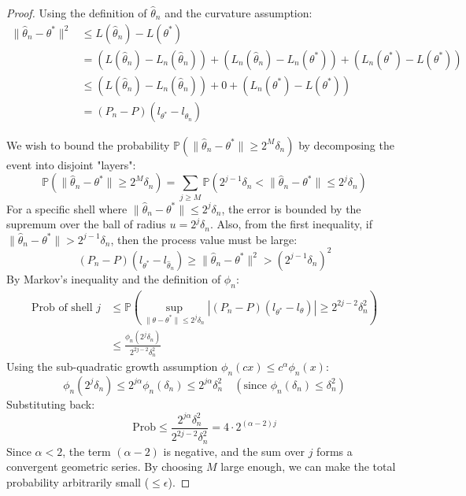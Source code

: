 \begin{proof}
Using the definition of $\hat{\theta}_n$ and the curvature assumption:
\begin{align*}
\|\hat{\theta}_n - \theta^*\|^2 &\le L(\hat{\theta}_n) - L(\theta^*) \\
&= (L(\hat{\theta}_n) - L_n(\hat{\theta}_n)) + (L_n(\hat{\theta}_n) - L_n(\theta^*)) + (L_n(\theta^*) - L(\theta^*)) \\
&\le (L(\hat{\theta}_n) - L_n(\hat{\theta}_n)) + 0 + (L_n(\theta^*) - L(\theta^*)) \\
&= (P_n - P)(l_{\theta^*} - l_{\hat{\theta}_n})
\end{align*}

We wish to bound the probability $\mathbb{P}(\|\hat{\theta}_n - \theta^*\| \ge 2^M \delta_n)$ by decomposing the event into disjoint "layers":
$$
\mathbb{P}(\|\hat{\theta}_n - \theta^*\| \ge 2^M \delta_n) = \sum_{j \ge M} \mathbb{P}\left( 2^{j-1}\delta_n < \|\hat{\theta}_n - \theta^*\| \le 2^j \delta_n \right)
$$
For a specific shell where $\|\hat{\theta}_n - \theta^*\| \le 2^j \delta_n$, the error is bounded by the supremum over the ball of radius $u = 2^j \delta_n$.
Also, from the first inequality, if $\|\hat{\theta}_n - \theta^*\| > 2^{j-1}\delta_n$, then the process value must be large:
$$
(P_n - P)(l_{\theta^*} - l_{\hat{\theta}_n}) \ge \|\hat{\theta}_n - \theta^*\|^2 > (2^{j-1}\delta_n)^2
$$
By Markov's inequality and the definition of $\phi_n$:
\begin{align*}
\text{Prob of shell } j &\le \mathbb{P}\left( \sup_{\|\theta-\theta^*\| \le 2^j \delta_n} |(P_n - P)(l_{\theta^*} - l_\theta)| \ge 2^{2j-2}\delta_n^2 \right) \\
&\le \frac{\phi_n(2^j \delta_n)}{2^{2j-2}\delta_n^2}
\end{align*}
Using the sub-quadratic growth assumption $\phi_n(cx) \le c^\alpha \phi_n(x)$:
$$
\phi_n(2^j \delta_n) \le 2^{j\alpha} \phi_n(\delta_n) \le 2^{j\alpha} \delta_n^2 \quad (\text{since } \phi_n(\delta_n) \le \delta_n^2)
$$
Substituting back:
$$
\text{Prob} \le \frac{2^{j\alpha} \delta_n^2}{2^{2j-2}\delta_n^2} = 4 \cdot 2^{(\alpha-2)j}
$$
Since $\alpha < 2$, the term $(\alpha-2)$ is negative, and the sum over $j$ forms a convergent geometric series. By choosing $M$ large enough, we can make the total probability arbitrarily small ($\le \epsilon$).
\end{proof}


